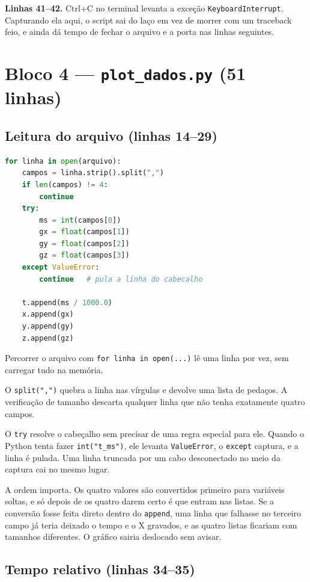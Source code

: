 \documentclass[11pt,a4paper]{article}
\begin{document}
\textbf{Linhas 41--42.} Ctrl+C no terminal levanta a exceção
\texttt{KeyboardInterrupt}. Capturando ela aqui, o script sai do laço em vez
de morrer com um traceback feio, e ainda dá tempo de fechar o arquivo e a
porta nas linhas seguintes.

\newpage
\section{Bloco 4 --- \texttt{plot\_dados.py} (51 linhas)}

\subsection{Leitura do arquivo (linhas 14--29)}

\begin{lstlisting}[language=Python,firstnumber=14]
for linha in open(arquivo):
    campos = linha.strip().split(",")
    if len(campos) != 4:
        continue
    try:
        ms = int(campos[0])
        gx = float(campos[1])
        gy = float(campos[2])
        gz = float(campos[3])
    except ValueError:
        continue   # pula a linha do cabecalho

    t.append(ms / 1000.0)
    x.append(gx)
    y.append(gy)
    z.append(gz)
\end{lstlisting}

Percorrer o arquivo com \texttt{for linha in open(...)} lê uma linha por vez,
sem carregar tudo na memória.

O \texttt{split(",")} quebra a linha nas vírgulas e devolve uma lista de
pedaços. A verificação de tamanho descarta qualquer linha que não tenha
exatamente quatro campos.

O \texttt{try} resolve o cabeçalho sem precisar de uma regra especial para
ele. Quando o Python tenta fazer \texttt{int("t\_ms")}, ele levanta
\texttt{ValueError}, o \texttt{except} captura, e a linha é pulada. Uma linha
truncada por um cabo desconectado no meio da captura cai no mesmo lugar.

A ordem importa. Os quatro valores são convertidos primeiro para variáveis
soltas, e só depois de os quatro darem certo é que entram nas listas. Se a
conversão fosse feita direto dentro do \texttt{append}, uma linha que falhasse
no terceiro campo já teria deixado o tempo e o X gravados, e as quatro listas
ficariam com tamanhos diferentes. O gráfico sairia deslocado sem avisar.

\subsection{Tempo relativo (linhas 34--35)}
\end{document}
